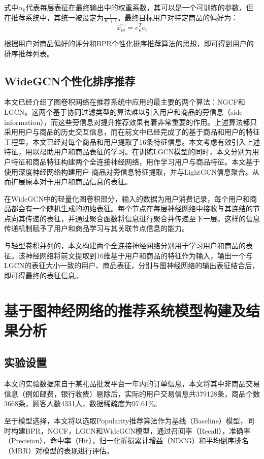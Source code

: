 \documentclass[lang=cn,11pt,a4paper,cite=authoryear]{elegantpaper}
\begin{document}
式中$\alpha_k$代表每层表征在最终输出中的权重系数，其可以是一个可训练的参数，但在推荐系统中，其统一被设定为$\frac{1}{K+1}$。最终目标用户对特定商品的偏好为：
\begin{equation}
  \hat{x_{ui}} = e_u^Te_i
\end{equation}

根据用户对商品偏好的评分和BPR个性化排序推荐算法的思想，即可得到用户的排序推荐列表。

\subsection{WideGCN个性化排序推荐}
本文已经介绍了图卷积网络在推荐系统中应用的最主要的两个算法：NGCF和LGCN。这两个基于协同过滤类型的算法难以引入用户和商品的旁信息（side information），而这些旁信息对提升推荐效果有着非常重要的作用。上述算法都只采用用户与商品的历史交互信息，而在前文中已经完成了的基于商品和用户的特征工程里，本文已经对每个商品和用户提取了16条特征信息。本文考虑有效引入上述特征，用以帮助用户和商品表征的学习。在训练LGCN模型的同时，本文分别为用户特征和商品特征构建两个全连接神经网络，用作学习用户与商品特征。本文基于使用深度神经网络构建用户-商品对旁信息特征提取，并与LightGCN信息聚合。从而扩展原本对于用户和商品信息的表征。

在WideGCN中的轻量化图卷积部分，输入的数据为用户消费记录，每个用户和商品都会有一个随机生成的初始表征。每个节点在每层神经网络中接收与其连结的节点向其传递的表征，并通过聚合函数将信息进行聚合并传递至下一层。这样的信息传递机制赋予了用户和商品学习与其关联节点信息的能力。

与轻型卷积并列的，本文构建两个全连接神经网络分别用于学习用户和商品的表征。该神经网络将前文提取到16维基于用户和商品的特征作为输入，输出一个与LGCN的表征大小一致的用户、商品表征，分别与图神经网络的输出表征结合后，即可得最终的表征信息。

\section{基于图神经网络的推荐系统模型构建及结果分析}
\subsection{实验设置}
本文的实验数据来自于某礼品批发平台一年内的订单信息，本文将其中非商品交易信息（例如邮费，银行收费）剔除后，实际的用户交易信息共379128条，商品个数3668条，顾客人数4331人，数据稀疏度为97.61\%。

至于模型选择，本文将以选取Popularity推荐算法作为基线（Baseline）模型，同时构建BPR，NGCF，LGCN和WideGCN模型，通过召回率（Recall），准确率（Precision），命中率（Hit），归一化折损累计增益（NDCG）和平均倒序排名（MRR）对模型的表现进行评估。
\end{document}
